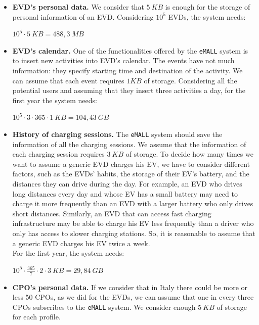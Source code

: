 \begin{itemize}
    \item \textbf{EVD's personal data.} We consider that $5\ KB$ is enough for the storage of personal information of an EVD\@.
    Considering $10^5$ EVDs, the system needs:
    \begin{center}
        $10^5\cdot5\ KB = 488,3\ MB$
    \end{center}
    \item \textbf{EVD's calendar.} One of the functionalities offered by the \verb|eMALL| system is to insert new activities
    into EVD's calendar.
    The events have not much information: they specify starting time and destination of the activity.
    We can assume that each event requires $1 KB$ of storage.
    Considering all the potential users and assuming that they insert three activities a day, for the first year the system needs:
    \begin{center}
        $10^5\cdot 3\cdot 365\cdot 1\ KB = 104,43\ GB$
    \end{center}
    \item \textbf{History of charging sessions.} The \verb|eMALL| system should save the information of all the charging sessions.
    We assume that the information of each charging session requires $3\ KB$ of storage.
    To decide how many times we want to assume a generic EVD charges his EV, we have to consider different factors,
    such as the EVDs' habits, the storage of their EV's battery, and the distances they can drive during the day.
    For example, an EVD who drives long distances every day and whose EV has a small battery may need to charge
    it more frequently than an EVD with a larger battery who only drives short distances.
    Similarly, an EVD that can access fast charging infrastructure may be able to charge his EV less frequently than
    a driver who only has access to slower charging stations.
    So, it is reasonable to assume that a generic EVD charges his EV twice a week. \\
    For the first year, the system needs:
    \begin{center}
        $10^5\cdot \frac{365}{7} \cdot 2\cdot 3\ KB = 29,84\ GB$
    \end{center}
    \item \textbf{CPO's personal data.} If we consider that in Italy there could be more or less 50 CPOs,
    as we did for the EVDs, we can assume that one in every three CPOs subscribes to the \verb|eMALL| system.
    We consider enough $5\ KB$ of storage for each profile.

\end{itemize}
